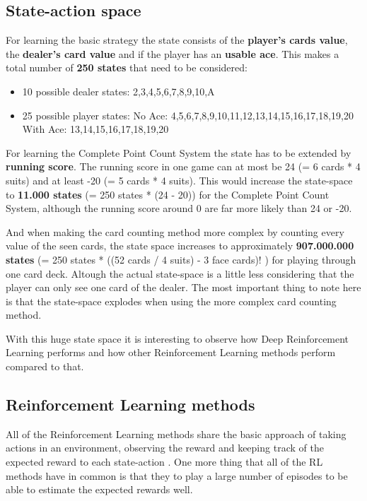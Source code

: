 \documentclass[conference]{IEEEtran}
\begin{document}
\subsection{State-action space}
For learning the basic strategy the state consists of the \textbf{player's cards value}, the \textbf{dealer's card value} and if the player has an \textbf{usable ace}. 
This makes a total number of \textbf{250 states} that need to be considered:
\begin{itemize}
	\item 10 possible dealer states: 2,3,4,5,6,7,8,9,10,A
	\item 25 possible player states:
		\subitem No Ace: 4,5,6,7,8,9,10,11,12,13,14,15,16,17,18,19,20
		\subitem With Ace: 13,14,15,16,17,18,19,20
\end{itemize}

For learning the Complete Point Count System the state has to be extended by \textbf{running score}.
The running score in one game can at most be 24 (= 6 cards * 4 suits) and at least -20 (= 5 cards * 4 suits).
This would increase the state-space to \textbf{11.000 states} (= 250 states * (24 - 20)) for the Complete Point Count System, although the running score around 0 are far more likely than 24 or -20.

And when making the card counting method more complex by counting every value of the seen cards, the state space increases to approximately \textbf{907.000.000 states} (= 250 states * ((52 cards / 4 suits) - 3 face cards)! ) for playing through one card deck.  
Altough the actual state-space is a little less considering that the player can only see one card of the dealer.
The most important thing to note here is that the state-space explodes when using the more complex card counting method. 

With this huge state space it is interesting to observe how Deep Reinforcement Learning performs and how other Reinforcement Learning methods perform compared to that. 


\subsection{Reinforcement Learning methods}
All of the Reinforcement Learning methods share the basic approach of taking actions in an environment, observing the reward and keeping track of the expected reward to each state-action \cite{b4}.
One more thing that all of the RL methods have in common is that they to play a large number of episodes to be able to estimate the expected rewards well.
\end{document}
